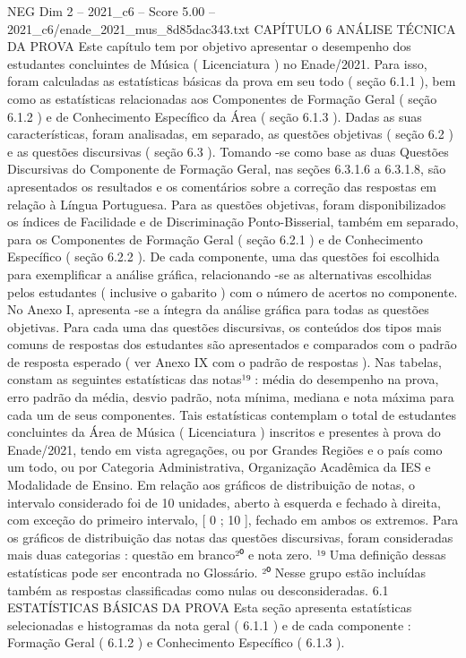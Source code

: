 \begin{textsample}{NEG Dim 2 – 2021\_c6 – Score 5.00 – 2021\_c6/enade\_2021\_mus\_8d85dac343.txt}  \label{ex:f2_neg_263}
CAPÍTULO 6 ANÁLISE TÉCNICA DA PROVA Este capítulo tem por objetivo apresentar o desempenho dos estudantes concluintes de Música ( Licenciatura ) no Enade/2021.
Para isso, foram calculadas as estatísticas básicas da prova em seu todo ( seção 6.1.1 ), bem como as estatísticas relacionadas aos Componentes de Formação Geral ( seção 6.1.2 ) e de Conhecimento Específico da Área ( seção 6.1.3 ).
Dadas as suas características, foram analisadas, em separado, as questões objetivas ( seção 6.2 ) e as questões discursivas ( seção 6.3 ).
Tomando -se como base as duas Questões Discursivas do Componente de Formação Geral, nas seções 6.3.1.6 a 6.3.1.8, são apresentados os resultados e os comentários sobre a correção das respostas em relação à Língua Portuguesa.
Para as questões objetivas, foram disponibilizados os índices de Facilidade e de Discriminação Ponto-Bisserial, também em separado, para os Componentes de Formação Geral ( seção 6.2.1 ) e de Conhecimento Específico ( seção 6.2.2 ).
De cada componente, uma das questões foi escolhida para exemplificar a análise gráfica, relacionando -se as alternativas escolhidas pelos estudantes ( inclusive o gabarito ) com o número de acertos no componente.
No Anexo I, apresenta -se a íntegra da análise gráfica para todas as questões objetivas.
Para cada uma das questões discursivas, os conteúdos dos tipos mais comuns de respostas dos estudantes são apresentados e comparados com o padrão de resposta esperado ( ver Anexo IX com o padrão de respostas ).
Nas tabelas, constam as seguintes estatísticas das notas¹⁹ : média do desempenho na prova, erro padrão da média, desvio padrão, nota mínima, mediana e nota máxima para cada um de seus componentes.
Tais estatísticas contemplam o total de estudantes concluintes da Área de Música ( Licenciatura ) inscritos e presentes à prova do Enade/2021, tendo em vista agregações, ou por Grandes Regiões e o país como um todo, ou por Categoria Administrativa, Organização Acadêmica da IES e Modalidade de Ensino.
Em relação aos gráficos de distribuição de notas, o intervalo considerado foi de 10 unidades, aberto à esquerda e fechado à direita, com exceção do primeiro intervalo, [ 0 ; 10 ], fechado em ambos os extremos.
Para os gráficos de distribuição das notas das questões discursivas, foram consideradas mais duas categorias : questão em branco²⁰ e nota zero. ¹⁹ Uma definição dessas estatísticas pode ser encontrada no Glossário. ²⁰ Nesse grupo estão incluídas também as respostas classificadas como nulas ou desconsideradas. 6.1 ESTATÍSTICAS BÁSICAS DA PROVA Esta seção apresenta estatísticas selecionadas e histogramas da nota geral ( 6.1.1 ) e de cada componente : Formação Geral ( 6.1.2 ) e Conhecimento Específico ( 6.1.3 ).

\end{textsample}
